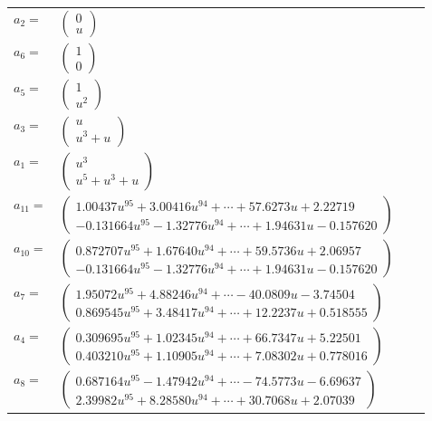 \documentclass[1p]{elsarticle_modified}
\theoremstyle{definition}
\begin{document}
\begin{tabular}{m{7pt} m{180pt} m{7pt} m{180pt} }
\flushright $a_{2}=$&$\begin{pmatrix}0\\u\end{pmatrix}$ \\
\flushright $a_{6}=$&$\begin{pmatrix}1\\0\end{pmatrix}$ \\
\flushright $a_{5}=$&$\begin{pmatrix}1\\u^2\end{pmatrix}$ \\
\flushright $a_{3}=$&$\begin{pmatrix}u\\u^3+u\end{pmatrix}$ \\
\flushright $a_{1}=$&$\begin{pmatrix}u^3\\u^5+u^3+u\end{pmatrix}$ \\
\flushright $a_{11}=$&$\begin{pmatrix}1.00437 u^{95}+3.00416 u^{94}+\cdots+57.6273 u+2.22719\\-0.131664 u^{95}-1.32776 u^{94}+\cdots+1.94631 u-0.157620\end{pmatrix}$ \\
\flushright $a_{10}=$&$\begin{pmatrix}0.872707 u^{95}+1.67640 u^{94}+\cdots+59.5736 u+2.06957\\-0.131664 u^{95}-1.32776 u^{94}+\cdots+1.94631 u-0.157620\end{pmatrix}$ \\
\flushright $a_{7}=$&$\begin{pmatrix}1.95072 u^{95}+4.88246 u^{94}+\cdots-40.0809 u-3.74504\\0.869545 u^{95}+3.48417 u^{94}+\cdots+12.2237 u+0.518555\end{pmatrix}$ \\
\flushright $a_{4}=$&$\begin{pmatrix}0.309695 u^{95}+1.02345 u^{94}+\cdots+66.7347 u+5.22501\\0.403210 u^{95}+1.10905 u^{94}+\cdots+7.08302 u+0.778016\end{pmatrix}$ \\
\flushright $a_{8}=$&$\begin{pmatrix}0.687164 u^{95}-1.47942 u^{94}+\cdots-74.5773 u-6.69637\\2.39982 u^{95}+8.28580 u^{94}+\cdots+30.7068 u+2.07039\end{pmatrix}$ \\

\end{tabular}
\end{document}
